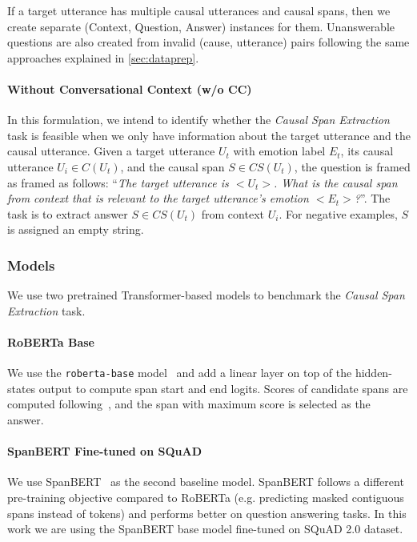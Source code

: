 \documentclass[smallextended]{svjour3}
\newcommand\code[1]{\texttt{#1}}
\newcommand\0{\hphantom{0}}
\begin{document}
If a target utterance has multiple causal utterances and causal spans, then we create separate (Context, Question, Answer) instances for them. Unanswerable questions are also created from invalid (cause, utterance) pairs following the same approaches explained in \cref{sec:dataprep}. 

\paragraph{Without Conversational Context (w/o CC)}
In this formulation, we intend to identify whether the \textit{Causal Span Extraction} task is feasible when we only have information about the target utterance and the causal utterance. Given a target utterance $U_t$ with emotion label $E_t$, its causal utterance 
$U_i \in C(U_t)$, and the causal span $S \in CS(U_t)$, the question is framed as framed as follows: ``\textit{The target utterance is ${<}U_t{>}$. What is the causal span from context that is relevant to the target utterance's emotion ${<}E_t{>}$?}''. The task is to extract answer $S \in CS(U_t)$ from context $U_i$. For negative examples, $S$ is assigned an empty string.

\subsubsection{Models}
We use 
two pretrained Transformer-based models to benchmark the \textit{Causal Span Extraction} task.


\paragraph{{RoBERTa Base}} We use the \code{roberta-base}
model~\cite{liu2019roberta} and add a linear layer on top of the hidden-states output to compute span start and end logits. Scores of candidate spans are computed following~\citet{devlin2018bert}, and the span with maximum score is selected as the answer.


\paragraph{{SpanBERT Fine-tuned on SQuAD}} We use SpanBERT~\citep{joshi2020spanbert} as the second baseline model. 
SpanBERT follows a different pre-training objective compared to RoBERTa (e.g. predicting masked contiguous spans instead of tokens) and performs better on question answering tasks. 
In this work we are using the SpanBERT base model fine-tuned on SQuAD 2.0 dataset.
\end{document}
